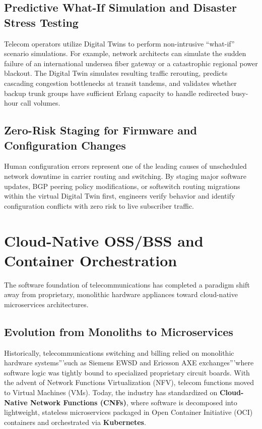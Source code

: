 \documentclass[12pt,a4paper]{report}
\begin{document}
\subsection{Predictive What-If Simulation and Disaster Stress Testing}
Telecom operators utilize Digital Twins to perform non-intrusive ``what-if'' scenario simulations. For example, network architects can simulate the sudden failure of an international undersea fiber gateway or a catastrophic regional power blackout. The Digital Twin simulates resulting traffic rerouting, predicts cascading congestion bottlenecks at transit tandems, and validates whether backup trunk groups have sufficient Erlang capacity to handle redirected busy-hour call volumes.

\subsection{Zero-Risk Staging for Firmware and Configuration Changes}
Human configuration errors represent one of the leading causes of unscheduled network downtime in carrier routing and switching. By staging major software updates, BGP peering policy modifications, or softswitch routing migrations within the virtual Digital Twin first, engineers verify behavior and identify configuration conflicts with zero risk to live subscriber traffic.

\section{Cloud-Native OSS/BSS and Container Orchestration}
The software foundation of telecommunications has completed a paradigm shift away from proprietary, monolithic hardware appliances toward cloud-native microservices architectures.

\subsection{Evolution from Monoliths to Microservices}
Historically, telecommunications switching and billing relied on monolithic hardware systems'''such as Siemens EWSD and Ericsson AXE exchanges'''where software logic was tightly bound to specialized proprietary circuit boards. With the advent of Network Functions Virtualization (NFV), telecom functions moved to Virtual Machines (VMs). Today, the industry has standardized on \textbf{Cloud-Native Network Functions (CNFs)}, where software is decomposed into lightweight, stateless microservices packaged in Open Container Initiative (OCI) containers and orchestrated via \textbf{Kubernetes}.
\end{document}
